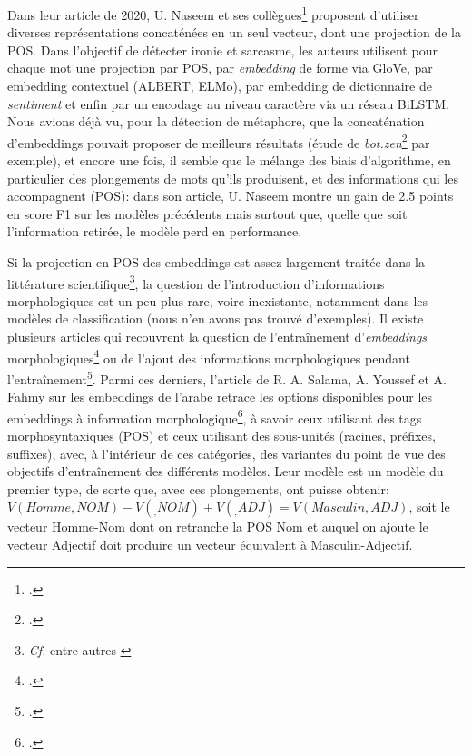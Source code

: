 Dans leur article de 2020, U. Naseem et ses collègues\footcite{naseem_towards_2020} proposent d'utiliser diverses représentations concaténées en un seul vecteur, dont une projection de la POS. Dans l'objectif de détecter ironie et sarcasme, les auteurs utilisent pour chaque mot une projection par POS, par \textit{embedding} de forme via GloVe, par embedding contextuel (ALBERT, ELMo), par embedding de dictionnaire de \textit{sentiment} et enfin par un encodage au niveau caractère via un réseau BiLSTM. Nous avions déjà vu, pour la détection de métaphore, que la concaténation d'embeddings pouvait proposer de meilleurs résultats (étude de \textit{bot.zen}\footcite{stemle_using_2018} par exemple), et encore une fois, il semble que le mélange des biais d'algorithme, en particulier des plongements de mots qu'ils produisent, et des informations qui les accompagnent (POS): dans son article, U. Naseem montre un gain de 2.5 points en score F1 sur les modèles précédents mais surtout que, quelle que soit l'information retirée, le modèle perd en performance.


Si la projection en POS des embeddings est assez largement traitée dans la littérature scientifique\footnote{\textit{Cf.} entre autres \cite{fell_comparing_2019,leong_report_2018}}, la question de l'introduction d'informations morphologiques est un peu plus rare, voire inexistante, notamment dans les modèles de classification (nous n'en avons pas trouvé d'exemples). Il existe plusieurs articles qui recouvrent la question de l'entraînement d'\textit{embeddings} morphologiques\footcite{cotterell_morphological_2015} ou de l'ajout des informations morphologiques pendant l'entraînement\footcite{cui_knet_2015}. Parmi ces derniers, l'article de R. A. Salama, A. Youssef et A. Fahmy sur les embeddings de l'arabe retrace les options disponibles pour les embeddings à information morphologique\footcite{salama_morphological_2018}, à savoir ceux utilisant des tags morphosyntaxiques (POS) et ceux utilisant des sous-unités (racines, préfixes, suffixes), avec, à l'intérieur de ces catégories, des variantes du point de vue des objectifs d'entraînement des différents modèles. Leur modèle est un modèle du premier type, de sorte que, avec ces plongements, ont puisse obtenir: $V(Homme,NOM) - V(_,NOM) + V(_,ADJ) = V(Masculin,ADJ)$, soit le vecteur Homme-Nom dont on retranche la POS Nom et auquel on ajoute le vecteur Adjectif doit produire un vecteur équivalent à Masculin-Adjectif.

